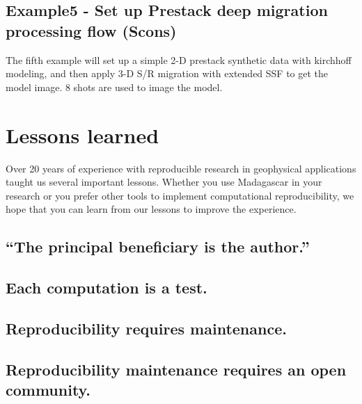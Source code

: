 \subsection{Example5 - Set up Prestack deep migration processing flow (Scons)}

The fifth example will set up a simple 2-D prestack synthetic data
with kirchhoff modeling, and then apply 3-D S/R migration with
extended SSF to get the model image. 8 shots are used to image the
model.




\section{Lessons learned}

Over 20 years of experience with reproducible research in geophysical
applications taught us several important lessons. Whether you use
Madagascar in your research or you prefer other tools to implement
computational reproducibility, we hope that you can learn from our
lessons to improve the experience.

\subsection{``The principal beneficiary is the author.''}

\subsection{Each computation is a test.}

\subsection{Reproducibility requires maintenance.}

\subsection{Reproducibility maintenance requires an open community.}

